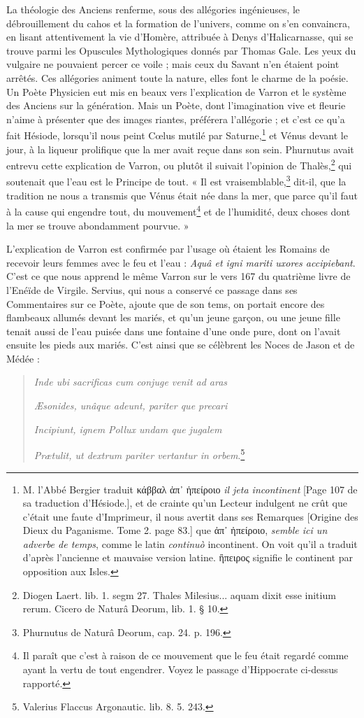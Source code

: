 \documentclass[a4paper, 11pt, oneside, polutonikogreek, french]{article}
\begin{document}
La théologie des Anciens renferme, sous des allégories ingénieuses, le débrouillement du cahos et la formation de l'univers, comme on s'en convaincra, en lisant attentivement la vie d'Homère, attribuée à Denys d'Halicarnasse, qui se trouve parmi les Opuscules Mythologiques donnés par Thomas Gale. Les yeux du vulgaire ne pouvaient percer ce voile ; mais ceux du Savant n'en étaient point arrêtés. Ces allégories animent toute la nature, elles font le charme de la poésie. Un Poète Physicien eut mis en beaux vers l'explication de Varron et le système des Anciens sur la génération. Mais un Poète, dont l'imagination vive et fleurie n'aime à présenter que des images riantes, préférera l'allégorie ; et c'est ce qu'a fait Hésiode, lorsqu'il nous peint Cœlus mutilé par Saturne,\footnote{M. l'Abbé Bergier traduit κάββαλ ἀπ᾽ ἠπείροιο \emph{il jeta incontinent} [Page 107 de sa traduction d'Hésiode.], et de crainte qu'un Lecteur indulgent ne crût que c'était une faute d'Imprimeur, il nous avertit dans ses Remarques [Origine des Dieux du Paganisme. Tome 2. page 83.] que ἀπ᾽ ἠπείροιο, \emph{semble ici un adverbe de temps}, comme le latin \emph{continuò} incontinent. On voit qu'il a traduit d'après l'ancienne et mauvaise version latine. ἢπειρος signifie le continent par opposition aux Isles.} et Vénus devant le jour, à la liqueur prolifique que la mer avait reçue dans son sein. Phurnutus avait entrevu cette explication de Varron, ou plutôt il suivait l'opinion de Thalès,\footnote{Diogen Laert. lib. 1. segm 27. Thales Milesius... aquam dixit esse initium rerum. Cicero de Naturâ Deorum, lib. 1. § 10.} qui soutenait que l'eau est le Principe de tout. « Il est vraisemblable,\footnote{Phurnutus de Naturâ Deorum, cap. 24. p. 196.} dit-il, que la tradition ne nous a transmis que Vénus était née dans la mer, que parce qu'il faut à la cause qui engendre tout, du mouvement\footnote{Il paraît que c'est à raison de ce mouvement que le feu était regardé comme ayant la vertu de tout engendrer. Voyez le passage d'Hippocrate ci-dessus rapporté.} et de l'humidité, deux choses dont la mer se trouve abondamment pourvue. »

L'explication de Varron est confirmée par l'usage où étaient les Romains de recevoir leurs femmes avec le feu et l'eau : \emph{Aquâ et igni mariti uxores accipiebant}. C'est ce que nous apprend le même Varron sur le vers 167 du quatrième livre de l'Enéïde de Virgile. Servius, qui nous a conservé ce passage dans ses Commentaires sur ce Poète, ajoute que de son tems, on portait encore des flambeaux allumés devant les mariés, et qu'un jeune garçon, ou une jeune fille tenait aussi de l'eau puisée dans une fontaine d'une onde pure, dont on l'avait ensuite les pieds aux mariés. C'est ainsi que se célèbrent les Noces de Jason et de Médée :
\begin{quotation}
\emph{Inde ubi sacrificas cum conjuge venit ad aras}

\emph{Æsonides, unâque adeunt, pariter que precari}

\emph{Incipiunt, ignem Pollux undam que jugalem}

\emph{Prætulit, ut dextrum pariter vertantur in orbem}.\footnote{Valerius Flaccus Argonautic. lib. 8. 5. 243.}
\end{quotation}
\end{document}

